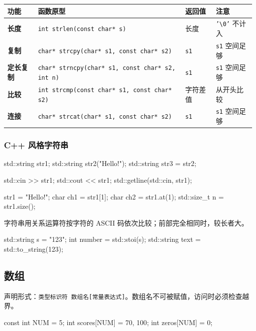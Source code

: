 \documentclass[UTF8,fontset=fandol,zihao=5]{ctexart}
\newcommand{\code}[1]{\texttt{#1}}
\begin{document}
\begin{center}
\begin{tabularx}{0.96\textwidth}{>{\bfseries}p{2.2cm}p{5.6cm}p{2.2cm}X}
\toprule
功能 & 函数原型 & 返回值 & 注意 \\
\midrule
长度 & \code{int strlen(const char* s)} & 长度 & \code{'\textbackslash0'} 不计入 \\
复制 & \code{char* strcpy(char* s1, const char* s2)} & \code{s1} & \code{s1} 空间足够 \\
定长复制 & \code{char* strncpy(char* s1, const char* s2, int n)} & \code{s1} & \code{s1} 空间足够 \\
比较 & \code{int strcmp(const char* s1, const char* s2)} & 字符差值 & 从开头比较 \\
连接 & \code{char* strcat(char* s1, const char* s2)} & \code{s1} & \code{s1} 空间足够 \\
\bottomrule
\end{tabularx}
\end{center}

\subsubsection{C++ 风格字符串}

\begin{cppcode}
std::string str1;
std::string str2("Hello!");
std::string str3 = str2;

std::cin >> str1;
std::cout << str1;
std::getline(std::cin, str1);

str1 = "Hello!";
char ch1 = str1[1];
char ch2 = str1.at(1);
std::size_t n = str1.size();
\end{cppcode}

字符串用关系运算符按字符的 ASCII 码依次比较；前部完全相同时，较长者大。

\begin{cppcode}[字符串与数字]
std::string s = "123";
int number = std::stoi(s);
std::string text = std::to_string(123);
\end{cppcode}

\subsection{数组}

声明形式：\code{类型标识符 数组名[常量表达式]}。数组名不可被赋值，访问时必须检查越界。

\begin{cppcode}[数组初始化]
const int NUM = 5;
int scores[NUM] = {70, 100};
int zeros[NUM] = {0};
\end{cppcode}
\end{document}

